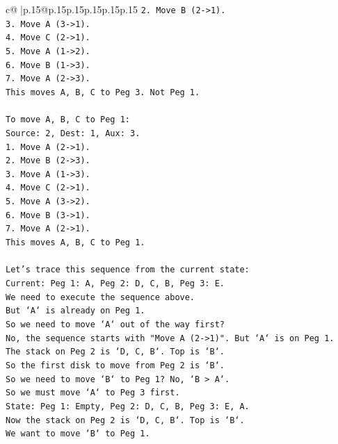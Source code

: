 \documentclass{article}
\begin{document}
{\begin{supertabular}{c@{$\;$}|p{.15\linewidth}@{}p{.15\linewidth}p{.15\linewidth}p{.15\linewidth}p{.15\linewidth}p{.15\linewidth}}
{{{\texttt{2. Move B (2{-}>1).} \\
\texttt{3. Move A (3{-}>1).} \\
\texttt{4. Move C (2{-}>1).} \\
\texttt{5. Move A (1{-}>2).} \\
\texttt{6. Move B (1{-}>3).} \\
\texttt{7. Move A (2{-}>3).} \\
\texttt{This moves A, B, C to Peg 3. Not Peg 1.} \\
\\ 
\texttt{To move A, B, C to Peg 1:} \\
\texttt{Source: 2, Dest: 1, Aux: 3.} \\
\texttt{1. Move A (2{-}>1).} \\
\texttt{2. Move B (2{-}>3).} \\
\texttt{3. Move A (1{-}>3).} \\
\texttt{4. Move C (2{-}>1).} \\
\texttt{5. Move A (3{-}>2).} \\
\texttt{6. Move B (3{-}>1).} \\
\texttt{7. Move A (2{-}>1).} \\
\texttt{This moves A, B, C to Peg 1.} \\
\\ 
\texttt{Let's trace this sequence from the current state:} \\
\texttt{Current: Peg 1: A, Peg 2: D, C, B, Peg 3: E.} \\
\texttt{We need to execute the sequence above.} \\
\texttt{But `A` is already on Peg 1.} \\
\texttt{So we need to move `A` out of the way first?} \\
\texttt{No, the sequence starts with "Move A (2{-}>1)". But `A` is on Peg 1.} \\
\texttt{The stack on Peg 2 is `D, C, B`. Top is `B`.} \\
\texttt{So the first disk to move from Peg 2 is `B`.} \\
\texttt{So we need to move `B` to Peg 1? No, `B > A`.} \\
\texttt{So we must move `A` to Peg 3 first.} \\
\texttt{State: Peg 1: Empty, Peg 2: D, C, B, Peg 3: E, A.} \\
\texttt{Now the stack on Peg 2 is `D, C, B`. Top is `B`.} \\
\texttt{We want to move `B` to Peg 1.} \\
}}}
\end{supertabular}}
\end{document}
